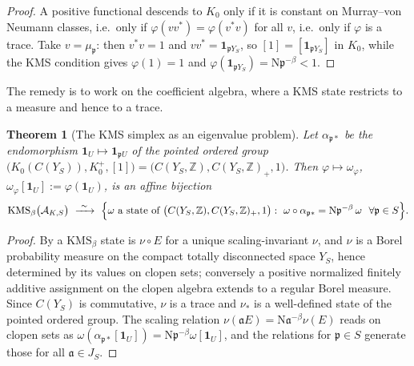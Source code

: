 \documentclass[11pt]{amsart}
\numberwithin{equation}{section}
\newtheorem{theorem}{Theorem}[section]
\theoremstyle{definition}
\theoremstyle{remark}
\newcommand{\Z}{\mathbb{Z}}
\newcommand{\cA}{\mathcal{A}}
\newcommand{\pp}{\mathfrak{p}}
\newcommand{\aaa}{\mathfrak{a}}
\newcommand{\Ns}{\mathrm{N}}
\begin{document}
\begin{proof}
A positive functional descends to $K_0$ only if it is constant on Murray--von Neumann
classes, i.e.\ only if $\varphi(vv^*)=\varphi(v^*v)$ for all $v$, i.e.\ only if $\varphi$ is
a trace. Take $v=\mu_\pp$: then $v^*v=1$ and $vv^*=\mathbf 1_{\pp Y_S}$, so
$[1]=[\mathbf 1_{\pp Y_S}]$ in $K_0$, while the KMS condition gives $\varphi(1)=1$ and
$\varphi(\mathbf 1_{\pp Y_S})=\Ns\pp^{-\beta}<1$.
\end{proof}

The remedy is to work on the coefficient algebra, where a KMS state restricts to a measure
and hence to a trace.

\begin{theorem}[The KMS simplex as an eigenvalue problem]\label{thm:eigen}
Let $\alpha_{\pp*}$ be the endomorphism $\mathbf 1_U\mapsto\mathbf 1_{\pp U}$ of the pointed
ordered group $\bigl(K_0(C(Y_S)),K_0^+,[1]\bigr)=\bigl(C(Y_S,\Z),C(Y_S,\Z)_+,1\bigr)$. Then
$\varphi\mapsto\omega_\varphi$, $\omega_\varphi[\mathbf 1_U]:=\varphi(\mathbf 1_U)$, is an
affine bijection
\[
\mathrm{KMS}_\beta\bigl(\cA_{K,S}\bigr)\ \xrightarrow{\ \sim\ }\
\Bigl\{\omega\ \text{a state of }\bigl(C(Y_S,\Z),C(Y_S,\Z)_+,1\bigr):\
\omega\circ\alpha_{\pp*}=\Ns\pp^{-\beta}\,\omega\ \ \forall\pp\in S\Bigr\}.
\]
\end{theorem}

\begin{proof}
By \cite[Prop.~2.8]{Main} a $\mathrm{KMS}_\beta$ state is $\nu\circ E$ for a unique
scaling-invariant $\nu$, and $\nu$ is a Borel probability measure on the compact totally
disconnected space $Y_S$, hence determined by its values on clopen sets; conversely a
positive normalized finitely additive assignment on the clopen algebra extends to a regular
Borel measure. Since $C(Y_S)$ is commutative, $\nu$ is a trace and $\nu_*$ is a well-defined
state of the pointed ordered group. The scaling relation $\nu(\aaa E)=\Ns\aaa^{-\beta}\nu(E)$
reads on clopen sets as $\omega(\alpha_{\pp*}[\mathbf 1_U])=\Ns\pp^{-\beta}\omega[\mathbf 1_U]$,
and the relations for $\pp\in S$ generate those for all $\aaa\in J_S$.
\end{proof}
\end{document}
